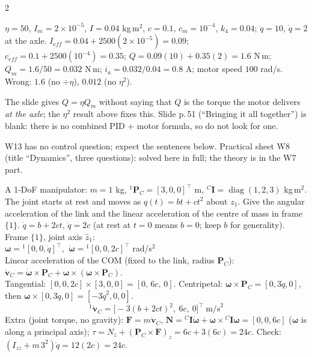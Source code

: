 \begin{multicols}{2}
\begin{worked}
$\eta=50$, $I_m=2\times10^{-5}$, $I=0.04$ kg\,m$^2$, $c=0.1$, $c_m=10^{-4}$, $k_4=0.04$; $\ddot q=10$, $\dot q=2$ at the axle. $I_{eff}=0.04+2500(2\times10^{-5})=0.09$; $c_{eff}=0.1+2500(10^{-4})=0.35$; $Q=0.09(10)+0.35(2)=1.6$ N\,m; $Q_m=1.6/50=0.032$ N\,m; $i_a=0.032/0.04=0.8$ A; motor speed $100$ rad/s. Wrong: $1.6$ (no $\div\eta$), $0.012$ (no $\eta^2$).
\end{worked}
\begin{slideerr}[p.50, p.51]
The slide gives $Q=\eta Q_m$ without saying that $Q$ is the torque the motor delivers \emph{at the axle}; the $\eta^2$ result above fixes this. Slide p.\,51 (``Bringing it all together'') is blank: there is no combined PID + motor formula, so do not look for one.
\end{slideerr}

W13 has no control question; expect the sentences below. Practical sheet W8 (title ``Dynamics'', three questions): solved here in full; the theory is in the W7 part.
\begin{examq}
A 1-DoF manipulator: $m=1$ kg, ${}^1\mathbf P_C=[3,0,0]^\top$ m, ${}^C\mathbf I=\operatorname{diag}(1,2,3)$ kg\,m$^2$. The joint starts at rest and moves as $q(t)=bt+ct^2$ about $z_1$. Give the angular acceleration of the link and the linear acceleration of the centre of mass in frame $\{1\}$.
\solution
$\dot q=b+2ct$, $\ddot q=2c$ (at rest at $t=0$ means $b=0$; keep $b$ for generality). Frame $\{1\}$, joint axis $\hat z_1$:\\
$\boldsymbol\omega={}^1[0,0,\dot q]^\top$, $\ \dot{\boldsymbol\omega}={}^1[0,0,2c]^\top$ rad/s$^2$ \\
Linear acceleration of the COM (fixed to the link, radius $\mathbf P_C$): $\dot{\mathbf v}_C=\dot{\boldsymbol\omega}\times\mathbf P_C+\boldsymbol\omega\times(\boldsymbol\omega\times\mathbf P_C)$.\\
Tangential: $[0,0,2c]\times[3,0,0]=[0,\,6c,\,0]$. Centripetal: $\boldsymbol\omega\times\mathbf P_C=[0,3\dot q,0]$, then $\boldsymbol\omega\times[0,3\dot q,0]=[-3\dot q^2,0,0]$.
\[\boxed{{}^1\dot{\mathbf v}_C=\big[-3(b+2ct)^2,\ 6c,\ 0\big]^\top\ \text{m/s}^2}\]
Extra (joint torque, no gravity): $\mathbf F=m\dot{\mathbf v}_C$, $\mathbf N={}^C\mathbf I\dot{\boldsymbol\omega}+\boldsymbol\omega\times{}^C\mathbf I\boldsymbol\omega=[0,0,6c]$ ($\boldsymbol\omega$ is along a principal axis); $\tau=N_z+(\mathbf P_C\times\mathbf F)_z=6c+3(6c)=24c$. Check: $(I_{zz}+m\,3^2)\ddot q=12(2c)=24c$.\\

\end{examq}
\end{multicols}

